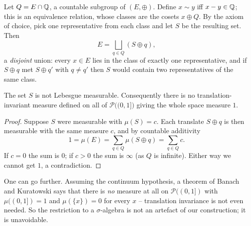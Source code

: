 \documentclass[a4paper]{scrartcl}
\begin{document}
Let $Q = E \cap \mathbb{Q}$, a countable subgroup of $(E, \oplus)$. Define $x \sim y$ iff $x - y \in \mathbb{Q}$; this is an equivalence relation, whose classes are the cosets $x \oplus Q$. By the axiom of choice, pick one representative from each class and let $S$ be the resulting set. Then
$$
E = \bigsqcup_{q \in Q} (S \oplus q),
$$
a \emph{disjoint} union: every $x \in E$ lies in the class of exactly one representative, and if $S \oplus q$ met $S \oplus q'$ with $q \neq q'$ then $S$ would contain two representatives of the same class.

\begin{center}
\end{center}

\begin{theorem}[Vitali]
	The set $S$ is not Lebesgue measurable. Consequently there is no translation-invariant measure defined on all of $\mathcal{P}\big((0,1]\big)$ giving the whole space measure $1$.
\end{theorem}
\begin{proof}
	Suppose $S$ were measurable with $\mu(S) = c$. Each translate $S \oplus q$ is then measurable with the same measure $c$, and by countable additivity
	$$
	1 = \mu(E) = \sum_{q \in Q} \mu(S \oplus q) = \sum_{q\in Q} c.
	$$
	If $c = 0$ the sum is $0$; if $c > 0$ the sum is $\infty$ (as $Q$ is infinite). Either way we cannot get $1$, a contradiction.
\end{proof}

\begin{remark}
	One can go further. Assuming the continuum hypothesis, a theorem of Banach and Kuratowski says that there is \emph{no} measure at all on $\mathcal{P}((0,1])$ with $\mu((0,1]) = 1$ and $\mu(\{x\}) = 0$ for every $x$ -- translation invariance is not even needed. So the restriction to a $\sigma$-algebra is not an artefact of our construction; it is unavoidable.
\end{remark}
\end{document}
